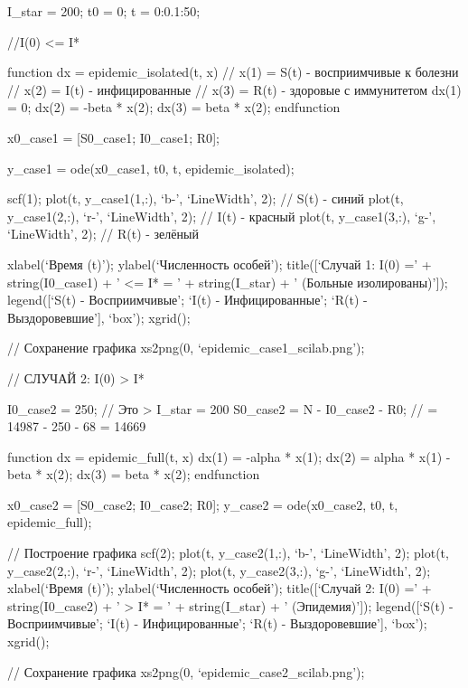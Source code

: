 \documentclass[
  12pt,
  a4paper,
  DIV=11,
  numbers=noendperiod]{scrreprt}
\begin{document}
I\_star = 200; t0 = 0; t = 0:0.1:50;

//I(0) \textless= I*

function dx = epidemic\_isolated(t, x) // x(1) = S(t) - восприимчивые к
болезни // x(2) = I(t) - инфицированные // x(3) = R(t) - здоровые с
иммунитетом dx(1) = 0; dx(2) = -beta * x(2); dx(3) = beta * x(2);
endfunction

x0\_case1 = {[}S0\_case1; I0\_case1; R0{]};

y\_case1 = ode(x0\_case1, t0, t, epidemic\_isolated);

scf(1); plot(t, y\_case1(1,:), \enquote*{b-}, \enquote*{LineWidth}, 2);
// S(t) - синий plot(t, y\_case1(2,:), \enquote*{r-},
\enquote*{LineWidth}, 2); // I(t) - красный plot(t, y\_case1(3,:),
\enquote*{g-}, \enquote*{LineWidth}, 2); // R(t) - зелёный

xlabel(\enquote*{Время (t)}); ylabel(\enquote*{Численность особей});
title({[}\enquote*{Случай 1: I(0) =} + string(I0\_case1) + ' \textless=
I* = ' + string(I\_star) + ' (Больные изолированы)'{]});
legend({[}\enquote*{S(t) - Восприимчивые}; \enquote*{I(t) -
Инфицированные}; \enquote*{R(t) - Выздоровевшие}{]}, \enquote*{box});
xgrid();

// Сохранение графика xs2png(0, \enquote*{epidemic\_case1\_scilab.png});

// СЛУЧАЙ 2: I(0) \textgreater{} I*

I0\_case2 = 250; // Это \textgreater{} I\_star = 200 S0\_case2 = N -
I0\_case2 - R0; // = 14987 - 250 - 68 = 14669

function dx = epidemic\_full(t, x) dx(1) = -alpha * x(1); dx(2) = alpha
* x(1) - beta * x(2); dx(3) = beta * x(2); endfunction

x0\_case2 = {[}S0\_case2; I0\_case2; R0{]}; y\_case2 = ode(x0\_case2,
t0, t, epidemic\_full);

// Построение графика scf(2); plot(t, y\_case2(1,:), \enquote*{b-},
\enquote*{LineWidth}, 2); plot(t, y\_case2(2,:), \enquote*{r-},
\enquote*{LineWidth}, 2); plot(t, y\_case2(3,:), \enquote*{g-},
\enquote*{LineWidth}, 2); xlabel(\enquote*{Время (t)});
ylabel(\enquote*{Численность особей}); title({[}\enquote*{Случай 2: I(0)
=} + string(I0\_case2) + ' \textgreater{} I* = ' + string(I\_star) + '
(Эпидемия)'{]}); legend({[}\enquote*{S(t) - Восприимчивые};
\enquote*{I(t) - Инфицированные}; \enquote*{R(t) - Выздоровевшие}{]},
\enquote*{box}); xgrid();

// Сохранение графика xs2png(0, \enquote*{epidemic\_case2\_scilab.png});
\end{document}
